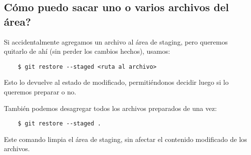     \subsection{C\'omo puedo sacar uno o varios archivos del área?}
        Si accidentalmente agregamos un archivo al \'area de staging, pero queremos quitarlo de ah\'i (sin perder los cambios hechos), usamos:
        \begin{lstlisting}
    $ git restore --staged <ruta al archivo>
        \end{lstlisting}
        Esto lo devuelve al estado de modificado, permiti\'endonos decidir luego si lo queremos preparar o no.

        También podemos desagregar todos los archivos preparados de una vez:
        \begin{lstlisting}
    $ git restore --staged .
        \end{lstlisting}
        Este comando limpia el \'area de staging, sin afectar el contenido modificado de los archivos.